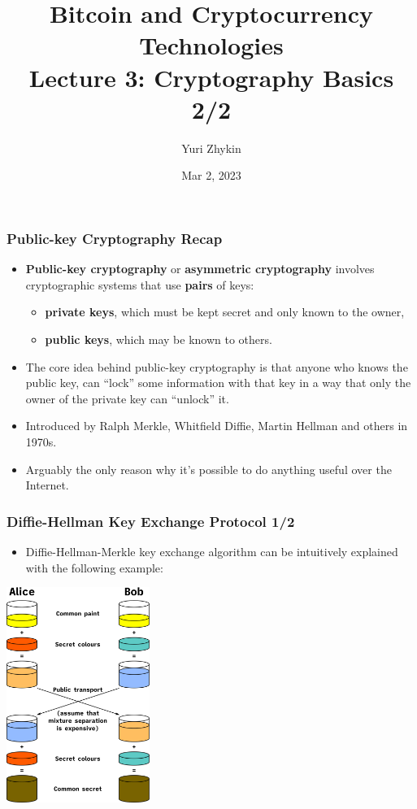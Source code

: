 \documentclass{beamer}
\title{
  Bitcoin and Cryptocurrency Technologies \\
  Lecture 3: Cryptography Basics 2/2
}
\author{Yuri Zhykin}
\date{Mar 2, 2023}
\begin{document}
\frame{\titlepage}

\begin{frame}
  \frametitle{Public-key Cryptography Recap}
  \begin{itemize}
  \item \textbf{Public-key cryptography} or \textbf{asymmetric cryptography}
    involves cryptographic systems that use \textbf{pairs} of keys:
    \begin{itemize}
    \item \textbf{private keys}, which must be kept secret and only known to the
      owner,
    \item \textbf{public keys}, which may be known to others.
    \end{itemize}
  \item The core idea behind public-key cryptography is that anyone who knows
    the public key, can ``lock'' some information with that key in a way that
    only the owner of the private key can ``unlock'' it.
  \item Introduced by Ralph Merkle, Whitfield Diffie, Martin Hellman and others
    in 1970s.
  \item Arguably the only reason why it's possible to do anything useful over
    the Internet.
  \end{itemize}
\end{frame}

\begin{frame}
  \frametitle{Diffie-Hellman Key Exchange Protocol 1/2}
  \begin{itemize}
  \item Diffie-Hellman-Merkle key exchange algorithm can be intuitively
    explained with the following example:
  \end{itemize}
  \begin{center}
    \includegraphics[width=0.35\textwidth]{dh}
  \end{center}
\end{frame}
\end{document}
